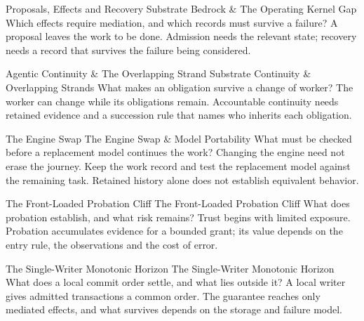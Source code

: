 \expandafter\def\csname pdlandmarktitle@01\endcsname{Proposals, Effects and Recovery}
\expandafter\def\csname pdlandmarkconcept@01\endcsname{Substrate Bedrock \& The Operating Kernel Gap}
\expandafter\def\csname pdlandmarkquestion@01\endcsname{Which effects require mediation, and which records must survive a failure?}
\expandafter\def\csname pdlandmarkquote@01\endcsname{A proposal leaves the work to be done. Admission needs the relevant state; recovery needs a record that survives the failure being considered.}

\expandafter\def\csname pdlandmarktitle@02\endcsname{Agentic Continuity \& The Overlapping Strand}
\expandafter\def\csname pdlandmarkconcept@02\endcsname{Substrate Continuity \& Overlapping Strands}
\expandafter\def\csname pdlandmarkquestion@02\endcsname{What makes an obligation survive a change of worker?}
\expandafter\def\csname pdlandmarkquote@02\endcsname{The worker can change while its obligations remain. Accountable continuity needs retained evidence and a succession rule that names who inherits each obligation.}

\expandafter\def\csname pdlandmarktitle@03\endcsname{The Engine Swap}
\expandafter\def\csname pdlandmarkconcept@03\endcsname{The Engine Swap \& Model Portability}
\expandafter\def\csname pdlandmarkquestion@03\endcsname{What must be checked before a replacement model continues the work?}
\expandafter\def\csname pdlandmarkquote@03\endcsname{Changing the engine need not erase the journey. Keep the work record and test the replacement model against the remaining task. Retained history alone does not establish equivalent behavior.}

\expandafter\def\csname pdlandmarktitle@04\endcsname{The Front-Loaded Probation Cliff}
\expandafter\def\csname pdlandmarkconcept@04\endcsname{The Front-Loaded Probation Cliff}
\expandafter\def\csname pdlandmarkquestion@04\endcsname{What does probation establish, and what risk remains?}
\expandafter\def\csname pdlandmarkquote@04\endcsname{Trust begins with limited exposure. Probation accumulates evidence for a bounded grant; its value depends on the entry rule, the observations and the cost of error.}

\expandafter\def\csname pdlandmarktitle@05\endcsname{The Single-Writer Monotonic Horizon}
\expandafter\def\csname pdlandmarkconcept@05\endcsname{The Single-Writer Monotonic Horizon}
\expandafter\def\csname pdlandmarkquestion@05\endcsname{What does a local commit order settle, and what lies outside it?}
\expandafter\def\csname pdlandmarkquote@05\endcsname{A local writer gives admitted transactions a common order. The guarantee reaches only mediated effects, and what survives depends on the storage and failure model.}

